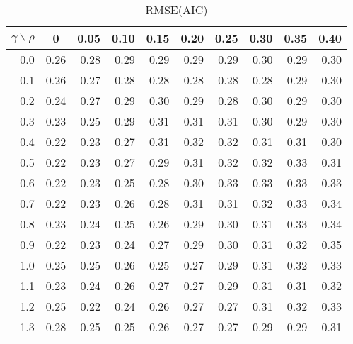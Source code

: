 \documentclass[12pt]{article}
\begin{document}
%
\begin{table}[!tbp]
\caption{RMSE(AIC)}
 \begin{center}
 \begin{tabular}{r|rrrrrrrrr}\hline\hline
\multicolumn{1}{c|}{$\gamma\backslash\rho$}&\multicolumn{1}{c}{0}&\multicolumn{1}{c}{0.05}&\multicolumn{1}{c}{0.10}&\multicolumn{1}{c}{0.15}&\multicolumn{1}{c}{0.20}&\multicolumn{1}{c}{0.25}&\multicolumn{1}{c}{0.30}&\multicolumn{1}{c}{0.35}&\multicolumn{1}{c}{0.40}\tabularnewline
\hline
0.0&0.26&0.28&0.29&0.29&0.29&0.29&0.30&0.29&0.30\tabularnewline
0.1&0.26&0.27&0.28&0.28&0.28&0.28&0.28&0.29&0.30\tabularnewline
0.2&0.24&0.27&0.29&0.30&0.29&0.28&0.30&0.29&0.30\tabularnewline
0.3&0.23&0.25&0.29&0.31&0.31&0.31&0.30&0.29&0.30\tabularnewline
0.4&0.22&0.23&0.27&0.31&0.32&0.32&0.31&0.31&0.30\tabularnewline
0.5&0.22&0.23&0.27&0.29&0.31&0.32&0.32&0.33&0.31\tabularnewline
0.6&0.22&0.23&0.25&0.28&0.30&0.33&0.33&0.33&0.33\tabularnewline
0.7&0.22&0.23&0.26&0.28&0.31&0.31&0.32&0.33&0.34\tabularnewline
0.8&0.23&0.24&0.25&0.26&0.29&0.30&0.31&0.33&0.34\tabularnewline
0.9&0.22&0.23&0.24&0.27&0.29&0.30&0.31&0.32&0.35\tabularnewline
1.0&0.25&0.25&0.26&0.25&0.27&0.29&0.31&0.32&0.33\tabularnewline
1.1&0.23&0.24&0.26&0.27&0.27&0.29&0.31&0.31&0.32\tabularnewline
1.2&0.25&0.22&0.24&0.26&0.27&0.27&0.31&0.32&0.33\tabularnewline
1.3&0.28&0.25&0.25&0.26&0.27&0.27&0.29&0.29&0.31\tabularnewline
\hline
\end{tabular}

\end{center}

\end{table}
\end{document}
